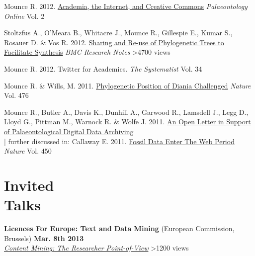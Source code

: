 \documentclass[margin,line]{resume}
\begin{document}
\begin{resume}
\vspace{-2mm}
    Mounce R. 2012.  \href{http://www.palaeontologyonline.com/articles/2012/life-as-a-palaeontologist-academia-the-internet-and-creative-commons/}{Academia, the Internet, and Creative Commons} \textsl{Palaeontology Online} Vol. 2

\vspace{-2mm}
    Stoltzfus A., O'Meara B., Whitacre J., Mounce R., Gillespie E., Kumar S., Rosauer D. \& Vos R. 2012. \href{http://dx.doi.org/10.1186/1756-0500-5-574}{Sharing and Re-use of Phylogenetic Trees to Facilitate Synthesis} \textsl{BMC Research Notes} \hfill {\color{red} \textgreater4700 views}

\vspace{-2mm}
    Mounce R. 2012. Twitter for Academics.
    \textsl{The Systematist} Vol. 34

\vspace{-2mm}
    Mounce R. \& Wills, M. 2011. \href{http://dx.doi.org/10.1038/nature10266}{Phylogenetic Position of Diania Challenged}
    \textsl{Nature} Vol. 476

\vspace{-2mm}
    Mounce R., Butler A., Davis K., Dunhill A., Garwood R., Lamsdell J., Legg D., Lloyd G., Pittman M., Warnock R. \& Wolfe J. 2011.
    \href{http://www.supportpalaeodataarchiving.co.uk/}{An Open Letter in Support of Palaeontological Digital Data Archiving} \\

\vspace{-6.5 mm} 
\vspace{-2mm} | further discussed in: Callaway E. 2011. \href{http://www.nature.com/news/2011/110411/full/472150a.html}{Fossil Data Enter The Web Period} \textsl{Nature} Vol. 450\\

\vspace{-7 mm}

    \section{\mysidestyle Invited\\Talks}

\textbf{Licences For Europe: Text and Data Mining} (European Commission, Brussels) \hfill \textbf{Mar. 8th 2013}\\
    \textsl{\href{http://www.slideshare.net/rossmounce/content-mining}{Content Mining: The Researcher Point-of-View}}  \hfill {\color{red}     	\textgreater 1200 views} \\ 


\end{resume}
\end{document}
